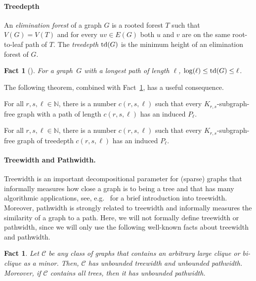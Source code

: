 \documentclass[runningheads,envcountsame]{llncs}
\newtheorem{fact}[theorem]{Fact}
\newcommand{\td}{{\textup{td}}}
\newcommand{\CCC}{\mathcal{C}}
\begin{document}
\paragraph{Treedepth}
An \emph{elimination forest} of a graph $G$ is a rooted
forest $T$ such that $V(G)=V(T)$ and for every $uv\in E(G)$
both $u$ and $v$ are on the same root-to-leaf path of $T$. The \emph{treedepth} $\td(G)$ is the minimum
height of an elimination forest of $G$. 
\begin{fact}[\cite{NM12}]\label{fact:pathLogtd}
  For a graph~$G$ with a longest path of length $\ell$,
  $\log(\ell) \leq  \td(G)\leq \ell$.
\end{fact}
The following theorem, combined with Fact~\ref{fact:pathLogtd},
has a useful consequence.
\begin{theorem}\label{thm:inducPathComBi}
  For all $r,s,\ell\in \mathbb{N}$, there is a number $c(r,s,\ell)$
  such that every $K_{r,s}$-subgraph-free graph with a path of length $c(r,s,\ell)$
  has an induced $P_\ell$.
\end{theorem}
\begin{corollary}\label{cor:longInducedPath}
    For all $r,s,\ell\in \mathbb{N}$, there is a number $c(r,s,\ell)$
    such that every $K_{r,s}$-subgraph-free graph of treedepth $c(r,s,\ell)$ has an induced $P_\ell$.
\end{corollary}

\paragraph{Treewidth and Pathwidth.} Treewidth is an important decompositional parameter for (sparse) graphs that informally measures how close a graph is to being a tree and that has many algorithmic applications, see,
e.g.~\cite{Marx10b} for a brief introduction into treewidth. Moreover,
pathwidth is strongly related to treewidth and informally measures the
similarity of a graph to a path. Here, we will
not formally define treewidth or pathwidth, since we will only use the following
well-known facts about treewidth and pathwidth.
\begin{fact}\label{fact:TW}
  Let $\CCC$ be any class of graphs that contains an arbitrary large
  clique or bi-clique as a minor. Then, $\CCC$ has unbounded treewidth
  and unbounded pathwidth. Moreover, if $\CCC$ contains all trees,
  then it has unbounded pathwidth.
\end{fact}   
\end{document}
